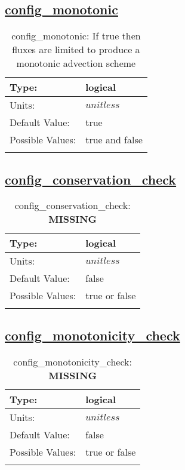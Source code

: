 \subsection[config\_monotonic]{\hyperref[sec:nm_tab_advection]{config\_monotonic}}
\label{subsec:nm_sec_config_monotonic}
\begin{center}
\begin{longtable}{| p{2.0in} || p{4.0in} |}
    \hline
    Type: & logical \\
    \hline
    Units: & $unitless$ \\
    \hline
    Default Value: & true \\
    \hline
    Possible Values: & true and false \\
    \hline
    \caption{config\_monotonic: If true then fluxes are limited to produce a monotonic advection scheme}
\end{longtable}
\end{center}
\subsection[config\_conservation\_check]{\hyperref[sec:nm_tab_advection]{config\_conservation\_check}}
\label{subsec:nm_sec_config_conservation_check}
\begin{center}
\begin{longtable}{| p{2.0in} || p{4.0in} |}
    \hline
    Type: & logical \\
    \hline
    Units: & $unitless$ \\
    \hline
    Default Value: & false \\
    \hline
    Possible Values: & true or false \\
    \hline
    \caption{config\_conservation\_check: {\bf \color{red} MISSING}}
\end{longtable}
\end{center}
\subsection[config\_monotonicity\_check]{\hyperref[sec:nm_tab_advection]{config\_monotonicity\_check}}
\label{subsec:nm_sec_config_monotonicity_check}
\begin{center}
\begin{longtable}{| p{2.0in} || p{4.0in} |}
    \hline
    Type: & logical \\
    \hline
    Units: & $unitless$ \\
    \hline
    Default Value: & false \\
    \hline
    Possible Values: & true or false \\
    \hline
    \caption{config\_monotonicity\_check: {\bf \color{red} MISSING}}
\end{longtable}
\end{center}

